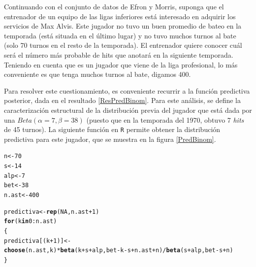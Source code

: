\documentclass[10pt,openright]{book}\usepackage[]{graphicx}\usepackage[]{color}
\makeatletter
\newcommand{\hlnum}[1]{\textcolor[rgb]{0.686,0.059,0.569}{#1}}%
\newcommand{\hlopt}[1]{\textcolor[rgb]{0,0,0}{#1}}%
\newcommand{\hlstd}[1]{\textcolor[rgb]{0.345,0.345,0.345}{#1}}%
\newcommand{\hlkwa}[1]{\textcolor[rgb]{0.161,0.373,0.58}{\textbf{#1}}}%
\newcommand{\hlkwb}[1]{\textcolor[rgb]{0.69,0.353,0.396}{#1}}%
\newcommand{\hlkwd}[1]{\textcolor[rgb]{0.737,0.353,0.396}{\textbf{#1}}}%
\newenvironment{kframe}{%
 \def\at@end@of@kframe{}%
 \ifinner\ifhmode%
  \def\at@end@of@kframe{\end{minipage}}%
  \begin{minipage}{\columnwidth}%
 \fi\fi%
 \def\FrameCommand##1{\hskip\@totalleftmargin \hskip-\fboxsep
 \colorbox{shadecolor}{##1}\hskip-\fboxsep
     \hskip-\linewidth \hskip-\@totalleftmargin \hskip\columnwidth}%
 \MakeFramed {\advance\hsize-\width
   \@totalleftmargin\z@ \linewidth\hsize
   \@setminipage}}%
 {\par\unskip\endMakeFramed%
 \at@end@of@kframe}
\newenvironment{knitrout}{}{} %
\makeatother
\begin{document}
    \begin{Eje}
    Continuando con el conjunto de datos de Efron y Morris, suponga que el entrenador de un equipo de las ligas inferiores est\'a interesado en adquirir los servicios de Max Alvis. Este jugador no tuvo un buen promedio de bateo en la temporada (est\'a situada en el \'ultimo lugar) y no tuvo muchos turnos al bate (solo 70 turnos en el resto de la temporada). El entrenador quiere conocer cu\'al ser\'a el n\'umero m\'as probable de hits que anotar\'a en la siguiente temporada. Teniendo en cuenta que es un jugador que viene de la liga profesional, lo m\'as conveniente es que tenga muchos turnos al bate, digamos 400.
    
    Para resolver este cuestionamiento, es conveniente recurrir a la funci\'on predictiva posterior, dada en el resultado \ref{ResPredBinom}. Para este an\'alisis, se define la caracterizaci\'on estructural de la distribuci\'on previa del jugador que est\'a dada por una $Beta(\alpha=7, \beta=38)$ (puesto que en la temporada del 1970, obtuvo 7 \emph{hits} de 45 turnos). La siguiente funci\'on en \texttt{R} permite obtener la distribuci\'on predictiva para este jugador, que se muestra en la figura \ref{PredBinom}.
    
\begin{knitrout}
\color{fgcolor}\begin{kframe}
\begin{alltt}
\hlstd{n} \hlkwb{<-} \hlnum{70}
\hlstd{s}\hlkwb{<-} \hlnum{14}
\hlstd{alp} \hlkwb{<-}\hlnum{7}
\hlstd{bet} \hlkwb{<-} \hlnum{38}
\hlstd{n.ast} \hlkwb{<-} \hlnum{400}

\hlstd{predictiva} \hlkwb{<-} \hlkwd{rep}\hlstd{(}\hlnum{NA}\hlstd{, n.ast}\hlopt{+}\hlnum{1}\hlstd{)}
\hlkwa{for}\hlstd{(k} \hlkwa{in} \hlnum{0}\hlopt{:}\hlstd{n.ast)}
\hlstd{\{}
\hlstd{predictiva[(k}\hlopt{+}\hlnum{1}\hlstd{)]} \hlkwb{<-}
  \hlkwd{choose}\hlstd{(n.ast, k)} \hlopt{*} \hlkwd{beta}\hlstd{(k}\hlopt{+}\hlstd{s}\hlopt{+}\hlstd{alp, bet}\hlopt{-}\hlstd{k}\hlopt{-}\hlstd{s}\hlopt{+}\hlstd{n.ast}\hlopt{+}\hlstd{n)} \hlopt{/} \hlkwd{beta}\hlstd{(s}\hlopt{+}\hlstd{alp, bet}\hlopt{-}\hlstd{s}\hlopt{+}\hlstd{n)}
\hlstd{\}}
\end{alltt}
\end{kframe}
\end{knitrout}
    

\end{Eje}
\end{document}
